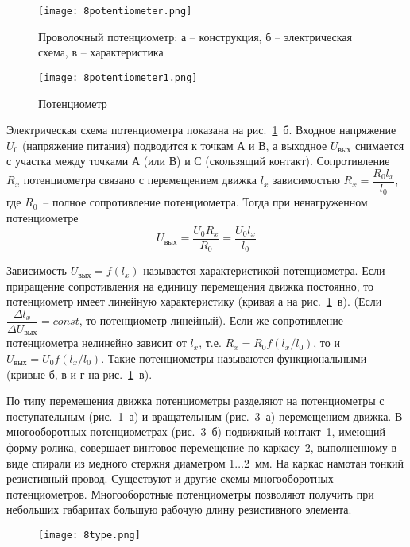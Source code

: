 \begin{figure}[h!]
	\texttt{[image: 8potentiometer.png]}
	\caption[Проволочный потенциометр]{ Проволочный потенциометр: а -- конструкция, б -- электрическая схема, в -- характеристика }
	\label{pic:8potentiometer}
\end{figure}

\begin{figure}[h!]
	\texttt{[image: 8potentiometer1.png]}
	\caption{ Потенциометр }
	\label{pic:8potentiometer1}
\end{figure}

Электрическая схема потенциометра показана на рис.~\ref{pic:8potentiometer}~б. Входное напряжение $ U_0 $ (напряжение питания) подводится к точкам А и В, а выходное $ U_\text{вых} $ снимается с участка между точками А (или В) и С (скользящий контакт). Сопротивление $ R_x $ потенциометра связано с перемещением движка $ l_x $ зависимостью $ R_x = \dfrac{R_0l_x}{l_0} $, где $ R_0 $~-- полное сопротивление потенциометра. Тогда при ненагруженном потенциометре
\[ U_\text{вых} = \dfrac{U_0 R_x}{R_0} = \dfrac{U_0 l_x}{l_0} \]

Зависимость $ U_\text{вых} = f(l_x) $ называется характеристикой потенциометра. Если приращение сопротивления на единицу перемещения движка постоянно, то потенциометр имеет линейную характеристику (кривая а на рис.~\ref{pic:8potentiometer}~в). (Если $ \dfrac{\Delta l_x}{\Delta U_\text{вых}} = const $, то потенциометр линейный). Если же сопротивление потенциометра нелинейно зависит от $ l_x $, т.е. $ R_x = R_0 f(l_x/l_0) $, то и $ U_\text{вых} = U_0 f(l_x/l_0) $. Такие потенциометры называются функциональными (кривые б, в и г на рис.~\ref{pic:8potentiometer}~в).

По типу перемещения движка потенциометры разделяют на потенциометры с поступательным (рис.~\ref{pic:8potentiometer}~а) и вращательным (рис.~\ref{pic:8type}~а) перемещением движка. В многооборотных потенциометрах (рис.~\ref{pic:8type}~б) подвижный контакт~1, имеющий форму ролика, совершает винтовое перемещение по каркасу~2, выполненному в виде спирали из медного стержня диаметром 1$ \ldots $2~мм. На каркас намотан тонкий резистивный провод. Существуют и другие схемы многооборотных потенциометров. Многооборотные потенциометры позволяют получить при небольших габаритах большую рабочую длину резистивного элемента.

\begin{figure}[h!]

	\texttt{[image: 8type.png]}
	\label{pic:8type}
\end{figure}

